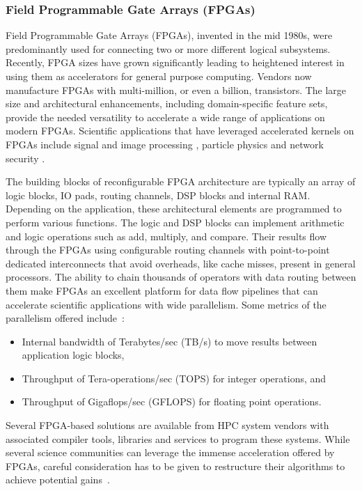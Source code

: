 \subsubsection{Field Programmable Gate Arrays (FPGAs)}
Field Programmable Gate Arrays (FPGAs), invented in the mid 1980s, were predominantly used for
connecting two or more different logical subsystems. 
Recently, FPGA sizes have grown significantly
leading to heightened interest in using them as accelerators for general purpose computing. Vendors now manufacture FPGAs with multi-million, 
or even a billion, transistors. 
The large size and architectural enhancements, 
including domain-specific feature sets, provide the needed versatility
to accelerate a wide range of applications on modern FPGAs. 
Scientific applications that have leveraged accelerated kernels on FPGAs include signal
and image processing \cite{Stitt:2011:E2EFPGA}, particle physics \cite{liu:2011:hades} and network
security \cite{jiang:2011:tvlsi}.

The building blocks of reconfigurable FPGA architecture are typically an array of logic blocks,
IO pads, routing channels, DSP blocks and internal RAM. Depending on the application, these
architectural elements are programmed to perform various functions. The logic and DSP blocks can
implement arithmetic and logic operations such as add, multiply, and compare. Their results flow
through the FPGAs using configurable routing channels with point-to-point dedicated interconnects
that avoid overheads, like cache misses, present in general processors. The ability to chain thousands
of operators with data routing between them make FPGAs an excellent platform for data flow
pipelines that can accelerate scientific applications with wide parallelism. 
Some metrics of the parallelism offered include~\cite{HPCFPGA}:
\begin{itemize}
\item Internal bandwidth of Terabytes/sec (TB/s) to move results between
  application logic blocks,
\item Throughput of Tera-operations/sec (TOPS) for integer operations, and
\item Throughput of Gigaflops/sec (GFLOPS) for floating point operations.
\end{itemize}
Several FPGA-based solutions are available from
HPC system vendors \cite{FPGA-Vendors} with associated 
compiler tools, libraries and services to program these systems. While several
science communities can leverage the immense acceleration offered by FPGAs, careful
consideration has to be given to restructure their algorithms to achieve potential
gains~\cite{Storaasli2007,Fu2009,Shafer2010,Convey,Baker2007,Yi2010,Putnam2009,Ganegedara2010,Hua2008}.


